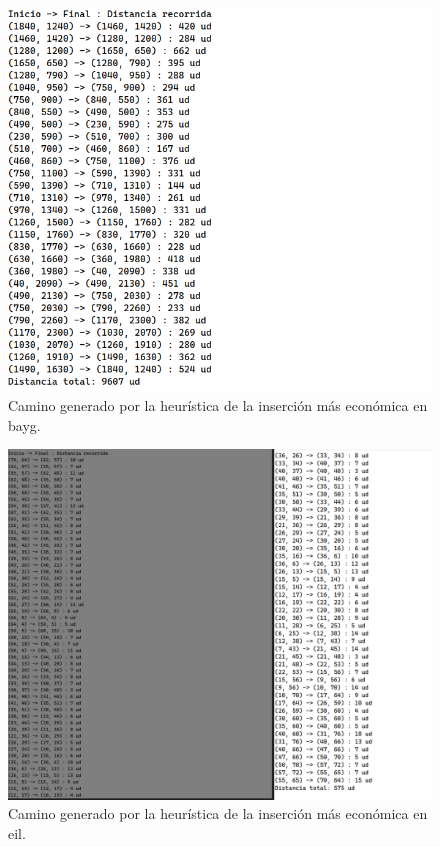 \begin{figure}[H]
  \centering
  \includegraphics[scale=0.5]{img/dist-insercion-bayg.png}
  \caption{Camino generado por la heurística de la inserción más económica en bayg.}
\end{figure}

\begin{figure}[H]
  \centering
  \includegraphics[scale=0.5]{img/dist-insercion-eil.png}
  \caption{Camino generado por la heurística de la inserción más económica en eil.}
\end{figure}

